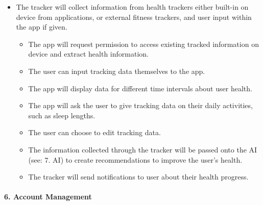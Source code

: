\documentclass[a4paper,11pt]{article} %
\begin{document}
\begin{itemize}
 
\item
  The tracker will collect information from health trackers either
  built-in on device from applications, or external fitness trackers,
  and user input within the app if given.

  \begin{itemize}
  \item
    The app will request permission to access existing tracked
    information on device and extract health information.
  \item
    The user can input tracking data themselves to the app.
  \item
    The app will display data for different time intervals about user
    health.
  \item
    The app will ask the user to give tracking data on their daily
    activities, such as sleep lengths.
  \item
    The user can choose to edit tracking data.
  \item
    The information collected through the tracker will be passed onto
    the AI (see: 7. AI) to create recommendations to improve the user's
    health.
  \item
    The tracker will send notifications to user about their health
    progress.
  \end{itemize}
\end{itemize}

\hypertarget{account-management}{%
\paragraph{6. Account Management}\label{account-management}}
\end{document}
